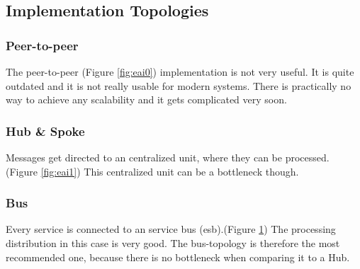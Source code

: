 \documentclass[12pt]{article}
\begin{document}
\subsection{Implementation Topologies}
\subsubsection{Peer-to-peer}
The peer-to-peer (Figure \ref{fig:eai0}) implementation is not very useful. It is quite outdated and it is not really usable for modern systems.
There is practically no way to achieve any scalability and it gets complicated very soon. 
\subsubsection{Hub \& Spoke}
Messages get directed to an centralized unit, where they can be processed. (Figure \ref{fig:eai1}) This centralized unit can be a bottleneck though. 
\subsubsection{Bus}
Every service is connected to an service bus (\gls{esb}).(Figure \ref{fig:eai2}) The processing distribution in this case is very good. The bus-topology is therefore the most recommended one, because there is no bottleneck when comparing it to a Hub.
\begin{figure}[here!]
\centering
\begin{minipage}[h]{0.3\textwidth}
\centering
    \label{fig:eai0}
\end{minipage}
\begin{minipage}[h]{0.3\textwidth}
\centering
    \label{fig:eai1}
\end{minipage}
\begin{minipage}[h]{0.3\textwidth}
\centering
    \label{fig:eai2}
\end{minipage}
\end{figure}
\FloatBarrier

\listoftables
\listoffigures
\printglossaries
\end{document}

